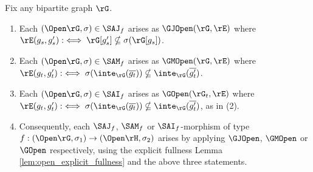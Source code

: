 \documentclass{article}
\begin{document}
\begin{lemma}
\label{lem:lifted_open_explicit_fullness}
\item
Fix any bipartite graph $\rG$.
\begin{enumerate}
\item
Each $(\Open\rG,\sigma) \in \SAJ_f$ arises as $\GJOpen(\rG,\rE)$ where $\rE(g_s,g'_s) :\iff \rG[g'_s] \nsubseteq \sigma(\rG[g_s])$.

\item
Each $(\Open\rG,\sigma) \in \SAM_f$ arises as $\GMOpen(\rG,\rE)$ where $\rE(g_t,g'_t) :\iff \sigma(\inte_\rG(\overline{g_t})) \nsubseteq \inte_\rG(\overline{g'_t})$.

\item
Each $(\Open\rG,\sigma) \in \SAI_f$ arises as $\GOpen(\rG_t,\rE)$ where $\rE(g_t,g'_t) :\iff \sigma(\inte_\rG(\overline{g_t})) \nsubseteq \inte_\rG(\overline{g'_t})$, as in (2).

\item
Consequently, each $\SAJ_f$, $\SAM_f$ or $\SAI_f$-morphism of type $f : (\Open\rG,\sigma_1) \to (\Open\rH,\sigma_2)$ arises by applying $\GJOpen$, $\GMOpen$ or $\GOpen$ respectively, using the explicit fullness Lemma \ref{lem:open_explicit_fullness} and the above three statements.

\end{enumerate}
\end{lemma}
\end{document}
